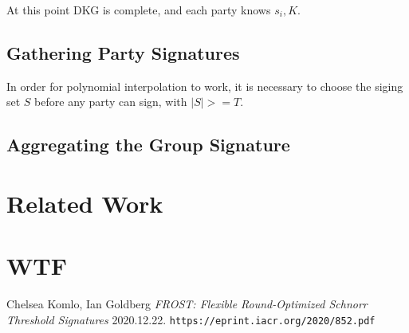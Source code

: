 \documentclass{article}
\begin{document}
At this point DKG is complete, and each party knows $s_i, K$.

\subsection{
  Gathering Party Signatures
}

In order for polynomial interpolation to work, it is necessary to choose the siging set $S$ before any party can sign, with $|S| >= T$.

\subsection{
  Aggregating the Group Signature
}


\newpage
\onecolumn
\section{
  Related Work
}


\newpage
\onecolumn
\section{
  WTF
}


\newpage
\onecolumn
\begin{thebibliography}{1}

  Chelsea Komlo, Ian Goldberg
  \emph{FROST: Flexible Round-Optimized Schnorr Threshold Signatures} 2020.12.22.
  \texttt{https://eprint.iacr.org/2020/852.pdf}

\end{thebibliography}
\end{document}

